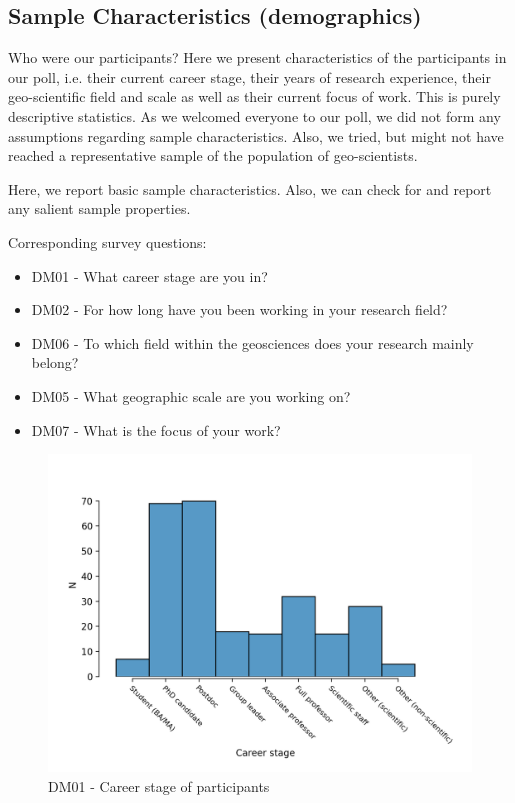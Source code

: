 \documentclass{article}
\begin{document}
\subsection{Sample Characteristics (demographics)}
Who were our participants?
Here we present characteristics of the participants in our poll, i.e. their current career stage, their years of research experience, their geo-scientific field and scale as well as their current focus of work.
This is purely descriptive statistics.
As we welcomed everyone to our poll, we did not form any assumptions regarding sample characteristics.
Also, we tried, but might not have reached a representative sample of the population of geo-scientists.

Here, we report basic sample characteristics. Also, we can check for and report any salient sample properties.

Corresponding survey questions:

\begin{itemize}
	\item DM01 - What career stage are you in?
	\item DM02 - For how long have you been working in your research field?
	\item DM06 - To which field within the geosciences does your research mainly belong?
	\item DM05 - What geographic scale are you working on?
	\item DM07 - What is the focus of your work?
\end{itemize}

\begin{figure}[!p]
    \centering
    \includegraphics[width=\textwidth]{../figs/DM01.png}
	\caption{DM01 - Career stage of participants}
    \label{fig:dm01}
\end{figure}
\end{document}
